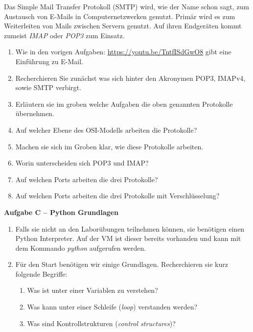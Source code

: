 \documentclass[paper=a4,fontsize=11pt]{scrartcl}%
\numberwithin{equation}{section}
\begin{document}
Das Simple Mail Transfer Protokoll (SMTP) wird, wie der Name schon sagt, zum Austausch von E-Mails in Computernetzwerken genutzt. Primär wird es zum Weiterleiten von Mails zwischen Servern genutzt. Auf ihren Endgeräten kommt zumeist \emph{IMAP} oder \emph{POP3} zum Einsatz. 
\begin{enumerate}
	\item Wie in den vorigen Aufgaben: \url{https://youtu.be/TntfISdGwO8} gibt eine Einführung zu E-Mail.
	\item Recherchieren Sie zunächst was sich hinter den Akronymen POP3, IMAPv4, sowie SMTP verbirgt.
	\item Erläutern sie im groben welche Aufgaben die oben genannten Protokolle übernehmen.
	\item Auf welcher Ebene des OSI-Modells arbeiten die Protokolle?
	\item Machen sie sich im Groben klar, wie diese Protokolle arbeiten.	
	\item Worin unterscheiden sich POP3 und IMAP?
	\item Auf welchen Ports arbeiten die drei Protokolle?
	\item Auf welchen Ports arbeiten die drei Protokolle mit Verschlüsselung?
\end{enumerate}

\begin{center}\Large{\textbf{Aufgabe C -- Python Grundlagen}}\end{center}\vskip0.25in

\begin{enumerate}
	\item Falls sie nicht an den Laborübungen teilnehmen können, sie benötigen einen Python Interpreter. Auf der VM ist dieser bereits vorhanden und kann mit dem Kommando \emph{python} aufgerufen werden.
	\item Für den Start benötigen wir einige Grundlagen. Recherchieren sie kurz folgende Begriffe:
	\begin{enumerate}
		\item Was ist unter einer Variablen zu verstehen?
		\item Was kann unter einer Schleife (\emph{loop}) verstanden werden?
		\item Was sind Kontrollstrukturen (\emph{control structures})?
	\end{enumerate}
\end{enumerate}

\printbibliography
\end{document}
